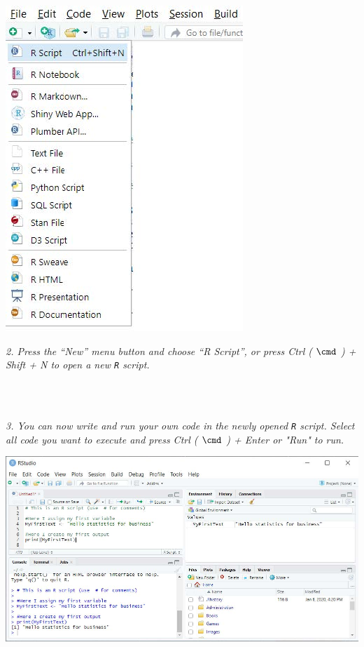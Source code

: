 \begin{minipage}{0.5\textwidth}
\includegraphics[width=.4\linewidth]{Files/Images/setup2.jpg}
\end{minipage}%
\hfill%
\begin{minipage}{0.4\textwidth}
\textit{2. Press the “New” menu button and choose
“R Script”, or press Ctrl ( $\cmd$ ) + Shift + N to
open a new \texttt{R} script.}
\end{minipage} \\
\\
\bigskip

\begin{minipage}{0.4\textwidth}
\textit{3. You can now write and run your
own code in the newly opened
\texttt{R} script. Select all code you
want to execute and press
Ctrl ( $\cmd$ ) + Enter or "Run" to run.}
\end{minipage}%
\hfill%
\begin{minipage}{0.55\textwidth}
\includegraphics[width=\linewidth]{Files/Images/setup3.jpg}
\end{minipage} \\
\\
\bigskip
